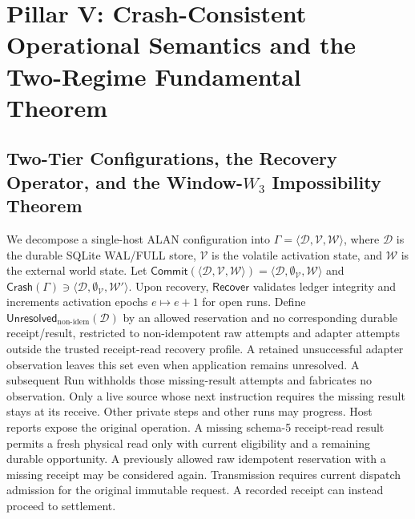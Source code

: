 \documentclass[11pt,a4paper]{article}
\theoremstyle{definition}
\theoremstyle{remark}
\begin{document}
\section{Pillar V: Crash-Consistent Operational Semantics and the Two-Regime Fundamental Theorem}

\subsection{Two-Tier Configurations, the Recovery Operator, and the Window-\texorpdfstring{$W_3$}{W3} Impossibility Theorem}
We decompose a single-host ALAN configuration into $\Gamma = \langle \mathcal{D}, \mathcal{V}, \mathcal{W} \rangle$, where $\mathcal{D}$ is the durable SQLite WAL/FULL store, $\mathcal{V}$ is the volatile activation state, and $\mathcal{W}$ is the external world state. Let $\mathsf{Commit}(\langle \mathcal{D}, \mathcal{V}, \mathcal{W} \rangle) = \langle \mathcal{D}, \emptyset_{\mathcal{V}}, \mathcal{W} \rangle$ and $\mathsf{Crash}(\Gamma) \ni \langle \mathcal{D}, \emptyset_{\mathcal{V}}, \mathcal{W}' \rangle$. Upon recovery, $\mathsf{Recover}$ validates ledger integrity and increments activation epochs $e \mapsto e+1$ for open runs. Define $\mathsf{Unresolved}_{\text{non-idem}}(\mathcal D)$ by an allowed reservation and no corresponding durable receipt/result, restricted to non-idempotent raw attempts and adapter attempts outside the trusted receipt-read recovery profile. A retained unsuccessful adapter observation leaves this set even when application remains unresolved. A subsequent Run withholds those missing-result attempts and fabricates no observation. Only a live source whose next instruction requires the missing result stays at its receive. Other private steps and other runs may progress. Host reports expose the original operation. A missing schema-5 receipt-read result permits a fresh physical read only with current eligibility and a remaining durable opportunity. A previously allowed raw idempotent reservation with a missing receipt may be considered again. Transmission requires current dispatch admission for the original immutable request. A recorded receipt can instead proceed to settlement.
\end{document}
